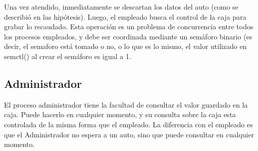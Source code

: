 \documentclass[12pt,a4paper,spanish]{article}
\begin{document}
	Una vez atendido, inmediatamente se descartan los datos del auto (como se describió en las hipótesis). Luego, el empleado busca el control de la caja para grabar lo recaudado. Esta operación es un problema de concurrencia entre todos los procesos empleados, y debe ser coordinada mediante un semáforo binario (es decir, el semaforo está tomado o no, o lo que es lo mismo, el valor utilizado en semctl() al crear el semáforo es igual a 1.
	
	\subsection{Administrador}
	
	El proceso administrador tiene la facultad de consultar el valor guardado en la caja. Puede hacerlo en cualquier momento, y su consulta sobre la caja esta controlada de la misma forma que el empleado. La diferencia con el empleado es que el Administrador no espera a un auto, sino que puede consultar en cualquier momento.
\end{document}
